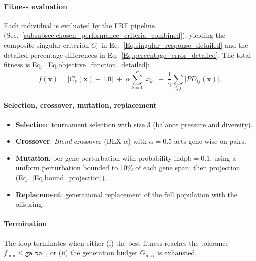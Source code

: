 \documentclass[12pt,a4paper]{article}
\begin{document}
    \paragraph{Fitness evaluation}
    Each individual is evaluated by the FRF pipeline (Sec.~\ref{subsubsec:chosen_performance_criteria_combined}), yielding the composite singular criterion $C_s$ in Eq.~\eqref{Eq.singular_response_detailed} and the detailed percentage differences in Eq.~\eqref{Eq.percentage_error_detailed}. The total fitness is Eq.~\eqref{Eq.objective_function_detailed}:
    \begin{equation}
        f(\mathbf{x})=\big|C_s(\mathbf{x})-1.0\big|\; +\; \alpha\sum_{k=1}^{P}|x_k|\; +\; \frac{1}{\gamma}\sum_{i,j}\big|PD_{ij}(\mathbf{x})\big|.
    \end{equation}

    \paragraph{Selection, crossover, mutation, replacement}
    \begin{itemize}
        \item \textbf{Selection}: tournament selection with size 3 (balance pressure and diversity).
        \item \textbf{Crossover}: \emph{Blend} crossover (BLX-\(\alpha\)) with $\alpha=0.5$ acts gene-wise on pairs.
        \item \textbf{Mutation}: per-gene perturbation with probability $\mathrm{indpb}=0.1$, using a uniform perturbation bounded to 10\% of each gene span; then projection (Eq.~\ref{Eq.bound_projection}).
        \item \textbf{Replacement}: generational replacement of the full population with the offspring.
    \end{itemize}

    \paragraph{Termination}
    The loop terminates when either (i) the best fitness reaches the tolerance $f_{\min}\le\texttt{ga\_tol}$, or (ii) the generation budget $G_{\max}$ is exhausted.
\end{document}
